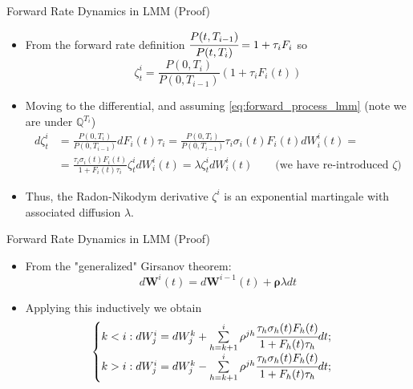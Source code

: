 \documentclass{beamer}
\begin{document}
\begin{frame}{Forward Rate Dynamics in LMM (Proof)}
	\begin{itemize}
		\item<1-> From the forward rate definition $\cfrac{P(t,T_{i-1})}{P(t,T_i)} = 1 + \tau_i F_i$ so
		\begin{equation*}
			\zeta^i_t = \frac{P(0, T_i)}{P(0, T_{i-1})}(1+\tau_i F_i(t))
		\end{equation*}
		\item Moving to the differential, and assuming \cref{eq:forward_process_lmm} (note we are under $\mathbb{Q}^{T_i}$)
		\begin{equation*}
			\begin{aligned}
				d\zeta^i_t &= \frac{P(0, T_i)}{P(0, T_{i-1})}dF_i(t)\tau_i = \frac{P(0, T_i)}{P(0, T_{i-1})}\tau_i\sigma_i(t)F_i(t)dW^i_i(t) = \\ &= \frac{\tau_i\sigma_i(t)F_i(t)}{1+F_i(t)\tau_i}\zeta_t^idW^i_i(t)=\lambda \zeta_t^idW^i_i(t) \quad\quad \text{(we have re-introduced $\zeta$)}
			\end{aligned}
		\end{equation*}
		\item<2-> Thus, the Radon-Nikodym derivative $\zeta^i$ is an exponential martingale with associated diffusion $\lambda$. %
	\end{itemize}
\end{frame}

\begin{frame}{Forward Rate Dynamics in LMM (Proof)}
	\begin{itemize}
		\item<1-> From the "generalized" Girsanov theorem:
		\begin{equation*}
			d\bm{W}^i(t) = d\bm{W}^{i-1}(t)+\bm{\rho}\lambda dt
		\end{equation*}
		\item<2-> Applying this inductively we obtain
		\begin{equation*}
			\begin{cases}
				k < i : dW^i_j = dW^k_j + \sum\limits_{h=k+1}^i \rho^{jh}\cfrac{\tau_h\sigma_h(t)F_h(t)}{1+F_h(t)\tau_h} dt;\\
				k > i : dW^i_j = dW^k_j - \sum\limits_{h=k+1}^i \rho^{jh}\cfrac{\tau_h\sigma_h(t)F_h(t)}{1+F_h(t)\tau_h} dt;\\
			\end{cases}
		\end{equation*}
	\end{itemize}
\end{frame}
\end{document}

